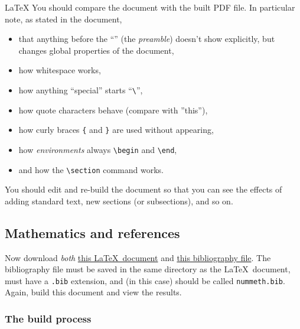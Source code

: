 \begin{chapter}{\LaTeX}
You should compare the document with the built PDF file. In particular note, as stated in the document,
%
\begin{itemize}
  \item that anything before the ``\verb||'' (the \emph{preamble}) doesn't show explicitly, but changes global properties of the document,
  \item how whitespace works,
  \item how anything ``special'' starts ``\verb|\|'',
  \item how quote characters behave (compare with ''this''),
  \item how curly braces \verb|{| and \verb|}| are used without
    appearing,
  \item how \emph{environments} always \verb|\begin| and
      \verb|\end|,
  \item and how the \verb|\section| command works.
\end{itemize}
%
You should edit and re-build the document so that you can see the effects of adding standard text, new sections (or subsections), and so on.

\subsection{Mathematics and references}

Now download \emph{both} \href{https://raw.githubusercontent.com/IanHawke/maths-with-python/master/latex/BasicLatexBibtex.tex}{this \LaTeX\ document} and \href{https://raw.githubusercontent.com/IanHawke/maths-with-python/master/latex/nummeth.bib}{this bibliography file}. The bibliography file must be saved in the same directory as the \LaTeX\ document, must have a \texttt{.bib} extension, and (in this case) should be called \texttt{nummeth.bib}. Again, build this document and view the results.

\subsubsection{The build process}


\end{chapter}
